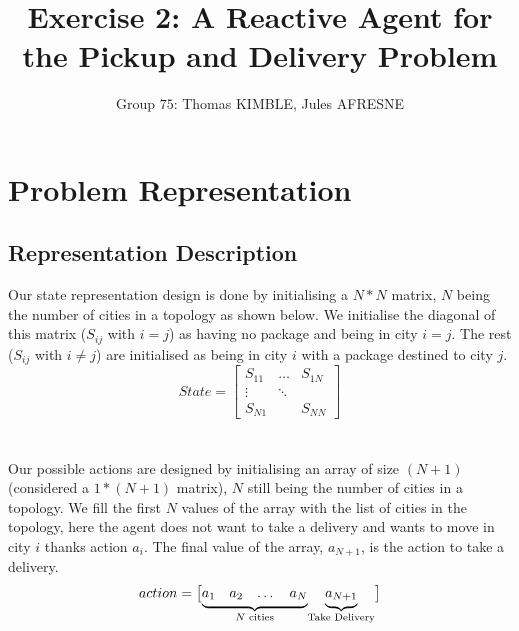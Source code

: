 \documentclass[11pt]{article}
\title{\bf Exercise 2: A Reactive Agent for the Pickup and Delivery Problem}
\author{Group \textnumero$75$: Thomas KIMBLE, Jules AFRESNE}
\begin{document}
\maketitle

\section{Problem Representation}

\subsection{Representation Description}

\indent \indent Our state representation design is done by initialising a $N * N$ matrix, $N$ being the number of cities in a topology as shown below. We initialise the diagonal of this matrix ($S_{ij}$ with $i=j$) as having no package and being in city $i=j$. The rest ($S_{ij}$ with $i \neq j$) are initialised as being in city $i$ with a package destined to city $j$.
\[
State = \begin{bmatrix} 
    S_{11} & \dots & S_{1N}\\
    \vdots & \ddots & \\
    S_{N1} &        & S_{NN} 
    \end{bmatrix}
\]
\\
\\
\indent Our possible actions are designed by initialising an array of size $(N+1)$ (considered a $1*(N+1)$ matrix), $N$ still being the number of cities in a topology. We fill the first $N$ values of the array with the list of cities in the topology, here the agent does not want to take a delivery and wants to move in city $i$ thanks action $a_i$. The final value of the array, $a_{N+1}$, is the action to take a delivery.
\[    
action = \begin{bmatrix}
    \smash[b]{\underbrace{\begin{matrix}a_1 & a_2 & \dots  & a_N \end{matrix}}_{N\text{ cities}}}
    \smash[b]{\underbrace{\begin{matrix}a_{N+1}\end{matrix}}_{\text{Take Delivery}}}
    \end{bmatrix}
\]
\\
\\
\end{document}
